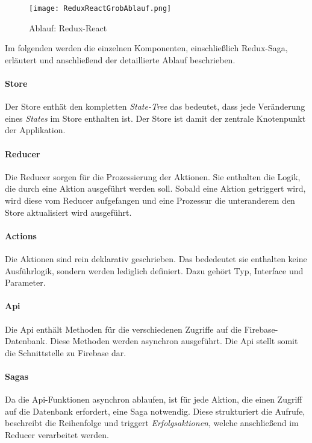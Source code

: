 \begin{figure}[h]
    \centering
    \texttt{[image: ReduxReactGrobAblauf.png]}
    \caption{Ablauf: Redux-React}
    \label{fig:ReduxReact}
\end{figure}

Im folgenden werden die einzelnen Komponenten, einschließlich Redux-Saga, erläutert und
anschließend der detaillierte Ablauf beschrieben.

\paragraph{Store}
Der Store enthät den kompletten \textit{State-Tree} das bedeutet, dass jede Veränderung
eines \textit{States} im Store enthalten ist. Der Store ist damit der zentrale Knotenpunkt der
Applikation.

\paragraph{Reducer}
Die Reducer sorgen für die Prozessierung der Aktionen. Sie enthalten die Logik, die
durch eine Aktion ausgeführt werden soll. Sobald eine Aktion getriggert wird, wird diese vom
Reducer aufgefangen und eine Prozessur die unteranderem den Store aktualisiert wird ausgeführt.

\paragraph{Actions}
Die Aktionen sind rein deklarativ geschrieben. Das bededeutet sie enthalten keine Ausführlogik,
sondern werden lediglich definiert. Dazu gehört Typ, Interface und Parameter.

\paragraph{Api}
Die Api enthält Methoden für die verschiedenen Zugriffe auf die Firebase-Datenbank.
Diese Methoden werden asynchron ausgeführt. Die Api stellt somit die Schnittstelle
zu Firebase dar.

\paragraph{Sagas}
Da die Api-Funktionen asynchron ablaufen, ist für jede Aktion, die einen Zugriff auf die
Datenbank erfordert, eine Saga notwendig. Diese strukturiert die Aufrufe, beschreibt
die Reihenfolge und triggert \textit{Erfolgsaktionen}, welche anschließend im Reducer
verarbeitet werden.

